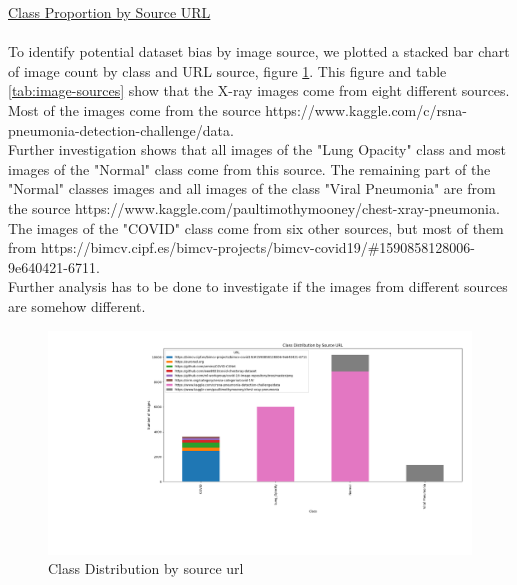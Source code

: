 \documentclass{article}
\begin{document}
\vspace{0.3cm}
\newpage
\noindent \underline{ Class Proportion by Source URL} \\
\\
To identify potential dataset bias by image source, we plotted a stacked bar chart of image count by class and URL source, figure  \ref{fig:distr_source_url}.  This figure and table \ref{tab:image-sources} show that the X-ray images come from eight different sources. Most of the images come from the source https://www.kaggle.com/c/rsna-pneumonia-detection-challenge/data. \\
Further investigation shows that all images of the "Lung Opacity" class and most images of the "Normal" class come from this source. The remaining part of the "Normal" classes images and all images of the class "Viral Pneumonia" are from the source https://www.kaggle.com/paultimothymooney/chest-xray-pneumonia. The images of the "COVID" class come from six other sources, but most of them from https://bimcv.cipf.es/bimcv-projects/bimcv-covid19/\#1590858128006-9e640421-6711. \\
Further analysis has to be done to investigate if the images from different sources are somehow different. 


\begin{figure}[h!] %
    \raggedright
    \includegraphics[width=1.0\linewidth]{class_distrbution_by_source_url.png}
    \caption{Class Distribution by source url}
    \label{fig:distr_source_url}
\end{figure}
\end{document}
